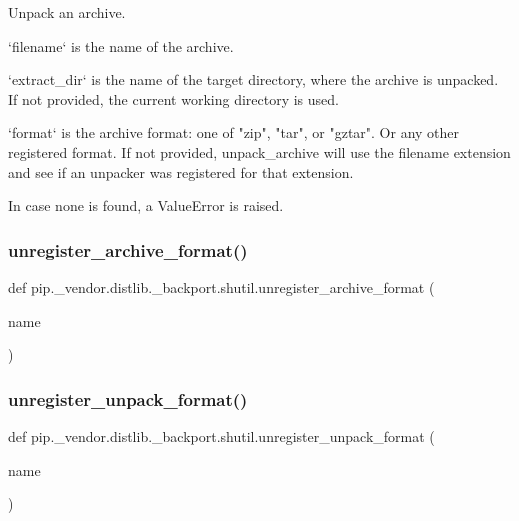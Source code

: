 \begin{DoxyVerb}Unpack an archive.

`filename` is the name of the archive.

`extract_dir` is the name of the target directory, where the archive
is unpacked. If not provided, the current working directory is used.

`format` is the archive format: one of "zip", "tar", or "gztar". Or any
other registered format. If not provided, unpack_archive will use the
filename extension and see if an unpacker was registered for that
extension.

In case none is found, a ValueError is raised.
\end{DoxyVerb}
 \mbox{\label{namespacepip_1_1__vendor_1_1distlib_1_1__backport_1_1shutil_af1641136218016c61ea3d7379436394f}} 
\subsubsection{\texorpdfstring{unregister\+\_\+archive\+\_\+format()}{unregister\_archive\_format()}}
{\footnotesize\ttfamily def pip.\+\_\+vendor.\+distlib.\+\_\+backport.\+shutil.\+unregister\+\_\+archive\+\_\+format (\begin{DoxyParamCaption}\item[{}]{name }\end{DoxyParamCaption})}

\mbox{\label{namespacepip_1_1__vendor_1_1distlib_1_1__backport_1_1shutil_a61777d8cdfecf8f5cd336ace2e2c285c}} 
\subsubsection{\texorpdfstring{unregister\+\_\+unpack\+\_\+format()}{unregister\_unpack\_format()}}
{\footnotesize\ttfamily def pip.\+\_\+vendor.\+distlib.\+\_\+backport.\+shutil.\+unregister\+\_\+unpack\+\_\+format (\begin{DoxyParamCaption}\item[{}]{name }\end{DoxyParamCaption})}

